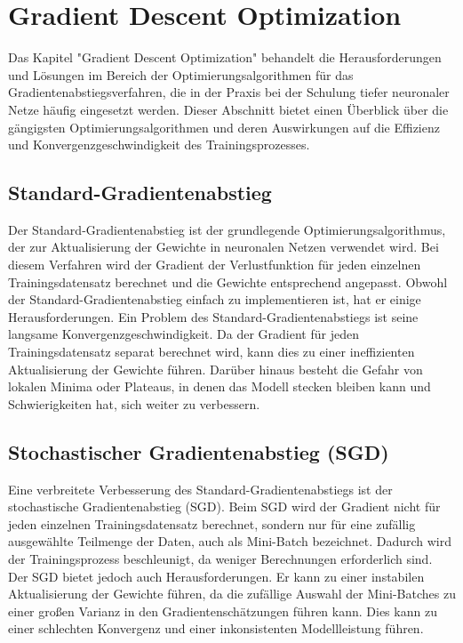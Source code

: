 \section{Gradient Descent Optimization}

    Das Kapitel "Gradient Descent Optimization" behandelt die Herausforderungen und Lösungen im Bereich der Optimierungsalgorithmen für das Gradientenabstiegsverfahren, die in der Praxis bei der Schulung tiefer neuronaler Netze häufig eingesetzt werden. 
    Dieser Abschnitt bietet einen Überblick über die gängigsten Optimierungsalgorithmen und deren Auswirkungen auf die Effizienz und Konvergenzgeschwindigkeit des Trainingsprozesses.

\subsection{Standard-Gradientenabstieg}

    Der Standard-Gradientenabstieg ist der grundlegende Optimierungsalgorithmus, der zur Aktualisierung der Gewichte in neuronalen Netzen verwendet wird. 
    Bei diesem Verfahren wird der Gradient der Verlustfunktion für jeden einzelnen Trainingsdatensatz berechnet und die Gewichte entsprechend angepasst. 
    Obwohl der Standard-Gradientenabstieg einfach zu implementieren ist, hat er einige Herausforderungen.
    Ein Problem des Standard-Gradientenabstiegs ist seine langsame Konvergenzgeschwindigkeit. 
    Da der Gradient für jeden Trainingsdatensatz separat berechnet wird, kann dies zu einer ineffizienten Aktualisierung der Gewichte führen. 
    Darüber hinaus besteht die Gefahr von lokalen Minima oder Plateaus, in denen das Modell stecken bleiben kann und Schwierigkeiten hat, sich weiter zu verbessern.

\subsection{Stochastischer Gradientenabstieg (SGD)}

    Eine verbreitete Verbesserung des Standard-Gradientenabstiegs ist der stochastische Gradientenabstieg (SGD). 
    Beim SGD wird der Gradient nicht für jeden einzelnen Trainingsdatensatz berechnet, sondern nur für eine zufällig ausgewählte Teilmenge der Daten, auch als Mini-Batch bezeichnet. 
    Dadurch wird der Trainingsprozess beschleunigt, da weniger Berechnungen erforderlich sind.
    Der SGD bietet jedoch auch Herausforderungen. 
    Er kann zu einer instabilen Aktualisierung der Gewichte führen, da die zufällige Auswahl der Mini-Batches zu einer großen Varianz in den Gradientenschätzungen führen kann. 
    Dies kann zu einer schlechten Konvergenz und einer inkonsistenten Modellleistung führen.

